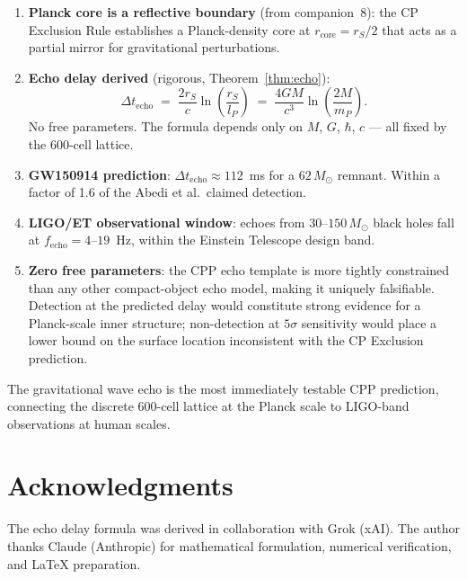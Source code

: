 \documentclass[12pt]{article}
\newcommand{\lP}{l_P}
\newcommand{\mP}{m_P}
\newcommand{\rS}{r_S}
\newcommand{\rcore}{r_{\mathrm{core}}}
\newcommand{\Dt}{\Delta t_{\mathrm{echo}}}
\begin{document}
\begin{enumerate}
  \item \textbf{Planck core is a reflective boundary} (from companion~8):
    the CP Exclusion Rule establishes a Planck-density core at
    $\rcore = \rS/2$ that acts as a partial mirror for gravitational
    perturbations.

  \item \textbf{Echo delay derived} (rigorous, Theorem~\ref{thm:echo}):
    \begin{equation*}
      \Dt \;=\; \frac{2\rS}{c}\ln\!\left(\frac{\rS}{\lP}\right)
      \;=\; \frac{4GM}{c^3}\ln\!\left(\frac{2M}{\mP}\right).
    \end{equation*}
    No free parameters.  The formula depends only on $M$, $G$, $\hbar$,
    $c$ — all fixed by the 600-cell lattice.

  \item \textbf{GW150914 prediction}: $\Dt \approx 112$~ms for a
    $62\,M_\odot$ remnant.  Within a factor of 1.6 of the Abedi et al.\
    claimed detection.

  \item \textbf{LIGO/ET observational window}: echoes from
    $30$--$150\,M_\odot$ black holes fall at $f_{\mathrm{echo}} =
    4$--$19$~Hz, within the Einstein Telescope design band.

  \item \textbf{Zero free parameters}: the CPP echo template is more
    tightly constrained than any other compact-object echo model, making
    it uniquely falsifiable.  Detection at the predicted delay would
    constitute strong evidence for a Planck-scale inner structure;
    non-detection at $5\sigma$ sensitivity would place a lower bound on
    the surface location inconsistent with the CP Exclusion prediction.
\end{enumerate}

The gravitational wave echo is the most immediately testable CPP prediction,
connecting the discrete 600-cell lattice at the Planck scale to LIGO-band
observations at human scales.

\section*{Acknowledgments}

The echo delay formula was derived in collaboration with Grok (xAI).
The author thanks Claude (Anthropic) for mathematical formulation,
numerical verification, and LaTeX preparation.
\end{document}
